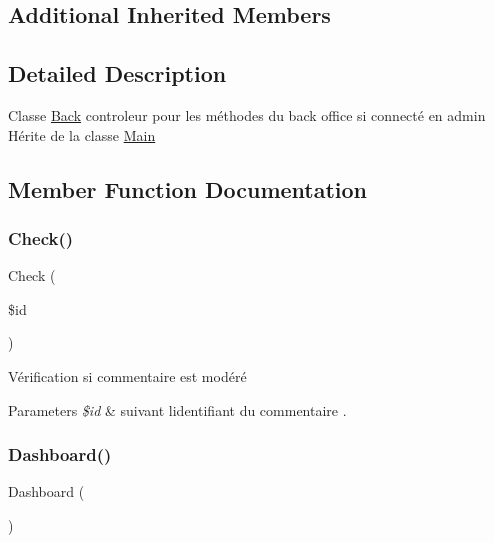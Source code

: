 \subsection*{Additional Inherited Members}


\subsection{Detailed Description}
Classe \hyperlink{class_src_1_1_controllers_1_1_back}{Back} controleur pour les méthodes du back office si connecté en admin Hérite de la classe \hyperlink{class_src_1_1_controllers_1_1_main}{Main} 

\subsection{Member Function Documentation}
\mbox{\label{class_src_1_1_controllers_1_1_back_a384a1ec9e22b88a73de48023bb2bbf4f}} 
\subsubsection{\texorpdfstring{Check()}{Check()}}
{\footnotesize\ttfamily Check (\begin{DoxyParamCaption}\item[{}]{\$id }\end{DoxyParamCaption})}

Vérification si commentaire est modéré 
\begin{DoxyParams}{Parameters}
{\em \$id} & suivant l\textquotesingle{}identifiant du commentaire . \\
\hline
\end{DoxyParams}
\mbox{\label{class_src_1_1_controllers_1_1_back_a405a66825259e2e811a2011a61c2beff}} 
\subsubsection{\texorpdfstring{Dashboard()}{Dashboard()}}
{\footnotesize\ttfamily Dashboard (\begin{DoxyParamCaption}{ }\end{DoxyParamCaption})}

